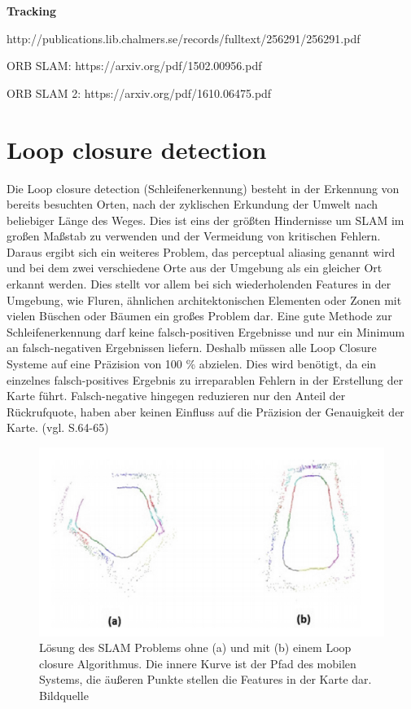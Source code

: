 \textbf{Tracking}

http://publications.lib.chalmers.se/records/fulltext/256291/256291.pdf

ORB SLAM:
https://arxiv.org/pdf/1502.00956.pdf

ORB SLAM 2:
https://arxiv.org/pdf/1610.06475.pdf


\section{Loop closure detection}

Die \glqq Loop closure detection\grqq{} (Schleifenerkennung) besteht in der Erkennung von bereits besuchten Orten, nach der zyklischen Erkundung der Umwelt nach beliebiger Länge des Weges. Dies ist eins der größten Hindernisse um SLAM im großen Maßstab zu verwenden und der Vermeidung von kritischen Fehlern. Daraus ergibt sich ein weiteres Problem, das \glqq perceptual aliasing\grqq{} genannt wird und bei dem zwei verschiedene Orte aus der Umgebung als ein gleicher Ort erkannt werden. Dies stellt vor allem bei sich wiederholenden Features in der Umgebung, wie Fluren, ähnlichen architektonischen Elementen oder Zonen mit vielen Büschen oder Bäumen ein großes Problem dar. Eine gute Methode zur Schleifenerkennung darf keine falsch-positiven Ergebnisse und nur ein Minimum an falsch-negativen Ergebnissen liefern. Deshalb müssen alle Loop Closure Systeme auf eine Präzision von 100 \% abzielen. Dies wird benötigt, da ein einzelnes falsch-positives Ergebnis zu irreparablen Fehlern in der Erstellung der Karte führt. Falsch-negative hingegen reduzieren nur den Anteil der Rückrufquote, haben aber keinen Einfluss auf die Präzision der Genauigkeit der Karte. (vgl. \cite{survey} S.64-65)

\begin{figure}[H]
	\centering
	\includegraphics[scale=0.5]{loop.png}
	\caption{ Lösung des SLAM Problems ohne (a) und mit (b) einem Loop closure Algorithmus. Die innere Kurve ist der Pfad des mobilen Systems, die äußeren Punkte stellen die Features in der Karte dar. Bildquelle \cite{loop_closure}}
\end{figure}  

